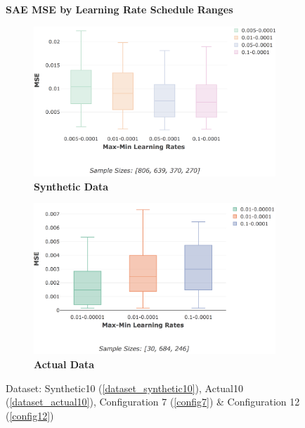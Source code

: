 \documentclass[a4paper,11pt,oneside]{article}
\theoremstyle{plain}
\theoremstyle{definition}
\begin{document}
	
	\begin{figure}[H]
		\centering
		\textbf{SAE MSE by Learning Rate Schedule Ranges}
		\begin{subfigure}{.5\textwidth}
			\centering 
			\includegraphics[scale=0.3]{images/results/8_6_complexity/synth_mse_minmax_lr.png}
			\caption{\textbf{Synthetic Data} 
				\newline }
			\label{figure-synth_mse_minmax_lr}
		\end{subfigure}%
		\begin{subfigure}{.5\textwidth}
			\centering 
			\includegraphics[scale=0.3]{images/results/8_6_complexity/actual_mse_minmax_lr.png}
			\caption{\textbf{Actual Data} 
				\newline }
			\label{figure-actual_mse_minmax_lr}
		\end{subfigure}
		\caption[SAE MSE by Learning Rate Schedule Ranges]
		{Dataset: Synthetic10 (\ref{dataset_synthetic10}), Actual10 (\ref{dataset_actual10}), Configuration 7 (\ref{config7}) \& Configuration 12 (\ref{config12})
}
\end{figure}
\end{document}
